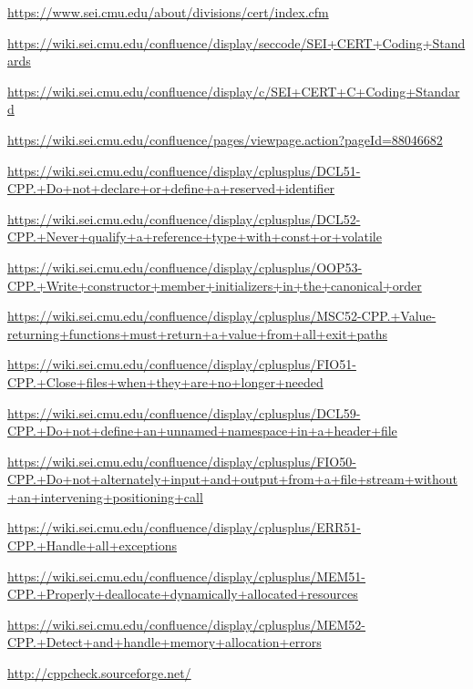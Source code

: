 
\begin{thebibliography}{0}
	
	\url{https://www.sei.cmu.edu/about/divisions/cert/index.cfm}
	
	\url{https://wiki.sei.cmu.edu/confluence/display/seccode/SEI+CERT+Coding+Standards}

	\url{https://wiki.sei.cmu.edu/confluence/display/c/SEI+CERT+C+Coding+Standard}

	\url{https://wiki.sei.cmu.edu/confluence/pages/viewpage.action?pageId=88046682}

	\url{https://wiki.sei.cmu.edu/confluence/display/cplusplus/DCL51-CPP.+Do+not+declare+or+define+a+reserved+identifier}

	\url{https://wiki.sei.cmu.edu/confluence/display/cplusplus/DCL52-CPP.+Never+qualify+a+reference+type+with+const+or+volatile}

	\url{https://wiki.sei.cmu.edu/confluence/display/cplusplus/OOP53-CPP.+Write+constructor+member+initializers+in+the+canonical+order}

	\url{https://wiki.sei.cmu.edu/confluence/display/cplusplus/MSC52-CPP.+Value-returning+functions+must+return+a+value+from+all+exit+paths}

	\url{https://wiki.sei.cmu.edu/confluence/display/cplusplus/FIO51-CPP.+Close+files+when+they+are+no+longer+needed}

	\url{https://wiki.sei.cmu.edu/confluence/display/cplusplus/DCL59-CPP.+Do+not+define+an+unnamed+namespace+in+a+header+file}
	
	\url{https://wiki.sei.cmu.edu/confluence/display/cplusplus/FIO50-CPP.+Do+not+alternately+input+and+output+from+a+file+stream+without+an+intervening+positioning+call}
	
	\url{https://wiki.sei.cmu.edu/confluence/display/cplusplus/ERR51-CPP.+Handle+all+exceptions}
	
	\url{https://wiki.sei.cmu.edu/confluence/display/cplusplus/MEM51-CPP.+Properly+deallocate+dynamically+allocated+resources}
	
	\url{https://wiki.sei.cmu.edu/confluence/display/cplusplus/MEM52-CPP.+Detect+and+handle+memory+allocation+errors}
	
	\url{http://cppcheck.sourceforge.net/}
\end{thebibliography}

